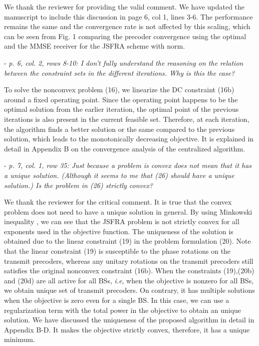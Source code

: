\begin{itemize}
\begin{itemize}
\resp We thank the reviewer for providing the valid comment. We have updated the manuscript to include this discussion in page 6, col 1, lines 3-6. The performance remains the same and the convergence rate is not affected by this scaling, which can be seen from Fig. 1 comparing the precoder convergence using the optimal and the MMSE receiver for the JSFRA scheme with  norm.

 - \textit{p. 6, col. 2, rows 8-10: I don't fully understand the reasoning on the relation between the constraint sets in the different iterations. Why is this the case?}

\resp To solve the nonconvex problem (16), we linearize the DC constraint (16b) around a fixed operating point. Since the operating point happens to be the optimal solution from the earlier iteration, the optimal point of the previous iterations is also present in the current feasible set. Therefore, at each iteration, the algorithm finds a better solution or the same compared to the previous solution, which leads to the monotonically decreasing objective. It is explained in detail in Appendix B on the convergence analysis of the centralized algorithm.

 - \textit{p. 7, col. 1, row 35: Just because a problem is convex does not mean that it has a unique solution. (Although it seems to me that (26) should have a unique solution.) Is the problem in (26) strictly convex?}

\resp We thank the reviewer for the critical comment. It is true that the convex problem does not need to have a unique solution in general. By using Minkowski inequality , we can see that the JSFRA problem is not strictly convex for all exponents  used in the objective function. The uniqueness of the solution is obtained due to the linear constraint (19) in the problem formulation (20). Note that the linear constraint (19) is susceptible to the phase rotations on the transmit precoders, whereas any unitary rotations on the transmit precoders still satisfies the original nonconvex constraint (16b). When the constraints (19),(20b) and (20d) are all active for all BSs, \textit{i.e}, when the objective is nonzero for all BSs, we obtain unique set of transmit precoders. On contrary, it has multiple solutions when the objective is zero even for a single BS. In this case, we can use a regularization term with the total power in the objective to obtain an unique solution. We have discussed the uniqueness of the proposed algorithm in detail in Appendix B-D. It makes the objective strictly convex, therefore, it has a unique minimum.


\end{itemize}
\end{itemize}
